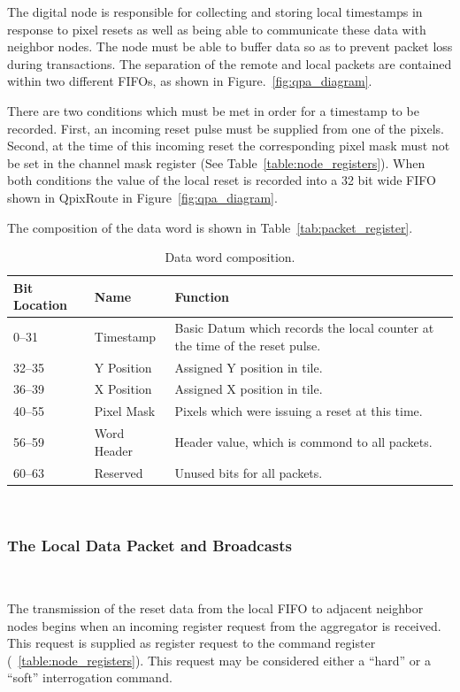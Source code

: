 The digital node is responsible for collecting and storing local timestamps in response to pixel resets as well as being able to communicate these data with neighbor nodes.
The node must be able to buffer data so as to prevent packet loss during transactions.
The separation of the remote and local packets are contained within two different FIFOs, as shown in Figure.~\ref{fig:qpa_diagram}.

There are two conditions which must be met in order for a timestamp to be recorded.
First, an incoming reset pulse must be supplied from one of the pixels.
Second, at the time of this incoming reset the corresponding pixel mask must not be set in the channel mask register (See Table~\ref{table:node_registers}).
When both conditions the value of the local reset is recorded into a 32 bit wide FIFO shown in QpixRoute in Figure~\ref{fig:qpa_diagram}.

The composition of the data word is shown in Table~\ref{tab:packet_register}.
\begin{table}
\begin{center}
\begin{tabular}{|| p{30mm} | p{30mm} | p{90mm} ||}
 \hline
 Bit Location & Name & Function \\ [0.5ex]
 \hline\hline
  0--31 & Timestamp & Basic Datum which records the local counter at the time of the reset pulse. \\
 \hline
  32--35 & Y Position & Assigned Y position in tile. \\
 \hline
  36--39 & X Position & Assigned X position in tile. \\
 \hline
  40--55 & Pixel Mask & Pixels which were issuing a reset at this time. \\
 \hline
  56--59 & Word Header & Header value, which is commond to all packets. \\
 \hline
  60--63 & Reserved & Unused bits for all packets. \\
 \hline
\end{tabular}
\caption{Data word composition.}
\end{center}
\end{table}~\label{tab:packet_data}

\subsubsection{The Local Data Packet and Broadcasts}~\label{sec:local_data_packet}

The transmission of the reset data from the local FIFO to adjacent neighbor nodes begins when an incoming register request from the aggregator is received.
This request is supplied as register request to the command register (~\ref{table:node_registers}).
This request may be considered either a ``hard'' or a ``soft'' interrogation command.

